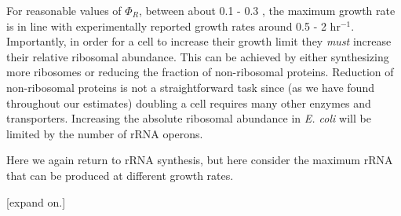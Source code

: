 For reasonable values of $\Phi_R$, between about 0.1 - 0.3 \citep{scott2010},
the maximum growth rate is in line with experimentally reported growth rates
around 0.5 - 2 hr$^{-1}$. Importantly, in order for a cell to increase their
growth limit they \textit{must} increase their relative ribosomal abundance.
This can be achieved by either synthesizing more ribosomes or reducing the
fraction of non-ribosomal proteins. Reduction of non-ribosomal proteins is not a
straightforward task since (as we have found throughout our estimates) doubling
a cell requires many other enzymes and transporters. Increasing the absolute
ribosomal abundance in \textit{E. coli} will be limited by the number of rRNA
operons.

Here we again return to rRNA synthesis, but here consider the maximum rRNA that can
be produced at different growth rates.

[expand on.]
